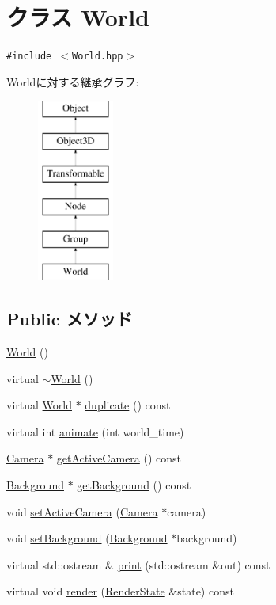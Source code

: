 \hypertarget{classm3g_1_1World}{
\section{クラス World}
\label{classm3g_1_1World}
}
{\tt \#include $<$World.hpp$>$}

Worldに対する継承グラフ:\begin{figure}[H]
\begin{center}
\leavevmode
\includegraphics[height=6cm]{classm3g_1_1World}
\end{center}
\end{figure}
\subsection*{Public メソッド}
\begin{CompactItemize}
\item 
\hyperlink{classm3g_1_1World_75e827b8787e735882f60c266d58e02e}{World} ()
\item 
virtual \hyperlink{classm3g_1_1World_bd170ded455f0b2273c1fe06da6ea0cb}{$\sim$World} ()
\item 
virtual \hyperlink{classm3g_1_1World}{World} $\ast$ \hyperlink{classm3g_1_1World_efde97aaf753d48fff769d9011f187f2}{duplicate} () const 
\item 
virtual int \hyperlink{classm3g_1_1World_8aad1ceab4c2a03609c8a42324ce484d}{animate} (int world\_\-time)
\item 
\hyperlink{classm3g_1_1Camera}{Camera} $\ast$ \hyperlink{classm3g_1_1World_812e01ec4fd0fd872b0ca5ea6a30b2f6}{getActiveCamera} () const 
\item 
\hyperlink{classm3g_1_1Background}{Background} $\ast$ \hyperlink{classm3g_1_1World_fb10ab7fd2ad14b7b1d49caf129670e0}{getBackground} () const 
\item 
void \hyperlink{classm3g_1_1World_dd9a82b335e8521592ad410c662a5cfd}{setActiveCamera} (\hyperlink{classm3g_1_1Camera}{Camera} $\ast$camera)
\item 
void \hyperlink{classm3g_1_1World_6193765c76d6dc0450f264918ebe7e1c}{setBackground} (\hyperlink{classm3g_1_1Background}{Background} $\ast$background)
\item 
virtual std::ostream \& \hyperlink{classm3g_1_1World_6fea17fa1532df3794f8cb39cb4f911f}{print} (std::ostream \&out) const 
\item 
virtual void \hyperlink{classm3g_1_1World_8babc8a79b78615da51161e94029eea9}{render} (\hyperlink{structm3g_1_1RenderState}{RenderState} \&state) const 
\end{CompactItemize}


